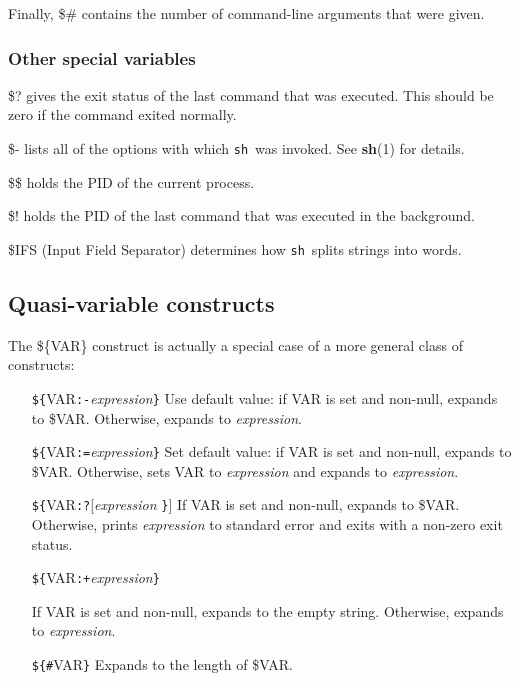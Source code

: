 \documentclass{article}
\newcommand{\code}[1]{\texttt{#1}}
\newcommand{\sh}{\code{sh}}
\begin{document}
	Finally, \$\# contains the number of command-line arguments
that were given.

\subsubsection{Other special variables}

	\$? gives the exit status of the last command that was
executed. This should be zero if the command exited normally.

	\$- lists all of the options with which \sh\ was invoked. See
\textbf{sh}(1) for details.

	\$\$ holds the PID of the current process.

	\$! holds the PID of the last command that was executed in the
background.

	\$IFS (Input Field Separator) determines how \sh\ splits
strings into words.

\subsection{Quasi-variable constructs}

	The \$\{VAR\} construct is actually a special case of a more
general class of constructs:

\begingroup
\settowidth{\leftmargini}{\code{\$\{}VAR\code{:?}[\textit{expression}]\code{\}}}
\addtolength{\leftmargini}{1em}
\begin{itemize}
\item[\code{\$\{}VAR\code{:-}\textit{expression}\code{\}}]
	Use default value: if VAR is set and non-null, expands to
	\$VAR. Otherwise, expands to \textit{expression}.
\item[\code{\$\{}VAR\code{:=}\textit{expression}\code{\}}]
	Set default value: if VAR is set and non-null, expands to
	\$VAR. Otherwise, sets VAR to \textit{expression} and expands
	to \textit{expression}.
\item[\code{\$\{}VAR\code{:?}[\textit{expression}]\code{\}}]
	If VAR is set and non-null, expands to \$VAR. Otherwise,
	prints \textit{expression} to standard error and exits with a
	non-zero exit status.
\item[\code{\$\{}VAR\code{:+}\textit{expression}\code{\}}]
	\begin{sloppy}
	If VAR is set and non-null, expands to the empty
	string. Otherwise, expands to \textit{expression}.
	\end{sloppy}
\item[\code{\$\{\#}VAR\code{\}}]
	Expands to the length of \$VAR.
\end{itemize}
\endgroup
\end{document}
